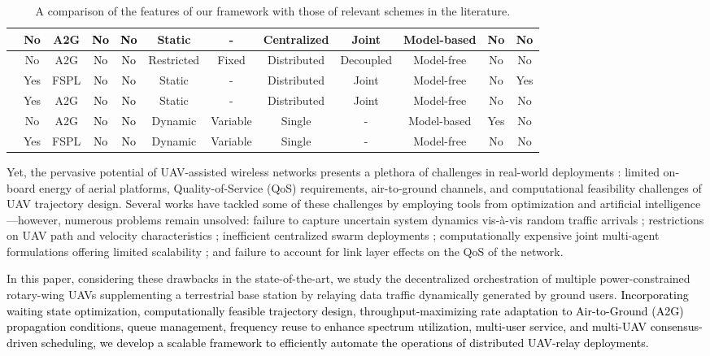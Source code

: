 \documentclass[10pt, twocolumn]{IEEEtran}
\theoremstyle{plain}
\theoremstyle{definition}
\theoremstyle{remark}
\newcommand\hlt[1]{\textcolor{black}{#1}}
\begin{document}
\begin{table}[t]
\begin{center}
\begin{tabular}{|*{12}{c|}}
    \hline
    \cite{MultiDroneDeployment} & No & A2G & \hlt{No} & \hlt{No} & Static & - & Centralized & Joint & Model-based & No & No\\
    \hline
    \cite{RLSenseSend} & No & A2G & \hlt{No} & \hlt{No} & Restricted & Fixed & Distributed & Decoupled & Model-free & No & No\\
    \hline
    \cite{DQNPositioning} & Yes & FSPL & \hlt{No} & \hlt{No} & Static & - & Distributed & Joint & Model-free & No & Yes\\
    \hline
    \cite{MLDeployment} & Yes & A2G & \hlt{No} & \hlt{No} & Static & - & Distributed & Joint & Model-free & No & No\\
    \hline
    \cite{Rician} & No & A2G & \hlt{No} & \hlt{No} & Dynamic & Variable & Single & - & Model-based & Yes & No\\
    \hline
    \cite{UAV-DRL} & Yes & FSPL & \hlt{No} & \hlt{No} & Dynamic & Variable & Single & - & Model-free & No & No\\
    \hline
    \end{tabular}
    \caption{A comparison of the features of our framework with those of relevant schemes in the literature.}
    \label{T1}
\end{center}
\vspace{-8mm}
\end{table}

Yet, the pervasive potential of UAV-assisted wireless networks presents a plethora of challenges in real-world deployments \cite{FundamentalTradeoffs}: limited on-board energy of aerial platforms, Quality-of-Service (QoS) requirements, air-to-ground channels, and computational feasibility challenges of UAV trajectory design. Several works have tackled some of these challenges by employing tools from optimization and artificial intelligence---however, numerous problems remain unsolved: failure to capture uncertain system dynamics vis-\`{a}-vis random traffic arrivals \cite{SCA, PAoI, MEC-CVX, LoSMap, Rician}; restrictions on UAV path and velocity characteristics \cite{PSOPathStructure, PAoI}; inefficient centralized swarm deployments \cite{CSCA-ADMM, JointTrajectoryDesign, MultiDroneDeployment}; computationally expensive joint multi-agent formulations offering limited scalability \cite{DDQN, MEC-DDPG, DQNPositioning, MLDeployment}; and failure to account for link layer effects on the QoS of the network.

In this paper, considering these drawbacks in the state-of-the-art, we study the decentralized orchestration of multiple power-constrained rotary-wing UAVs supplementing a terrestrial base station by relaying data traffic dynamically generated by ground users. \hlt{Incorporating waiting state optimization, computationally feasible trajectory design, throughput-maximizing rate adaptation to Air-to-Ground (A2G) propagation conditions, queue management, frequency reuse to enhance spectrum utilization, multi-user service, and multi-UAV consensus-driven scheduling, we develop a scalable framework to efficiently automate the operations of distributed UAV-relay deployments.}
\end{document}
